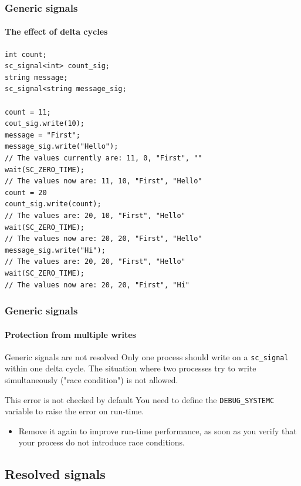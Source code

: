 \begin{frame}[fragile]
\frametitle{Generic signals}
\framesubtitle{The effect of delta cycles}

{\scriptsize 
\begin{verbatim}
int count;
sc_signal<int> count_sig;
string message;
sc_signal<string message_sig;

count = 11;
cout_sig.write(10);
message = "First";
message_sig.write("Hello");
// The values currently are: 11, 0, "First", ""
wait(SC_ZERO_TIME);
// The values now are: 11, 10, "First", "Hello"
count = 20
count_sig.write(count);
// The values are: 20, 10, "First", "Hello"
wait(SC_ZERO_TIME);
// The values now are: 20, 20, "First", "Hello"
message_sig.write("Hi");
// The values are: 20, 20, "First", "Hello"
wait(SC_ZERO_TIME);
// The values now are: 20, 20, "First", "Hi"
\end{verbatim}
}
\end{frame}

\begin{frame}
\frametitle{Generic signals}
\framesubtitle{Protection from multiple writes}

\begin{block}{Generic signals are not resolved}
Only one process should write on a \texttt{sc\_signal} within one delta cycle. 
The situation where two processes try to write simultaneously ("race condition") is not allowed.
\end{block}
\pause
\begin{block}{This error is not checked by default}
You need to define the \texttt{DEBUG\_SYSTEMC} variable to raise the error on run-time.
\begin{itemize}
\item Remove it again to improve run-time performance, as soon as you verify that your process do not introduce race conditions.
\end{itemize}
\end{block}
\end{frame}

\subsection{Resolved signals}

